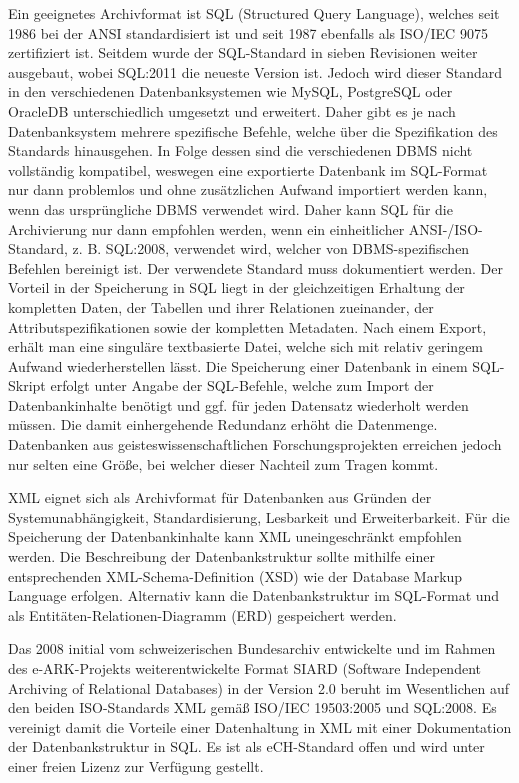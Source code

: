 Ein geeignetes Archivformat ist SQL (Structured Query Language), welches seit 1986 bei der ANSI standardisiert ist und seit 1987 ebenfalls als ISO/IEC 9075 zertifiziert ist. Seitdem wurde der SQL-Standard in sieben Revisionen weiter ausgebaut, wobei SQL:2011 die neueste Version ist. Jedoch wird dieser Standard in den verschiedenen Datenbanksystemen wie MySQL, PostgreSQL oder OracleDB unterschiedlich umgesetzt und erweitert. Daher gibt es je nach Datenbanksystem mehrere spezifische Befehle, welche über die Spezifikation des Standards hinausgehen. In Folge dessen sind die verschiedenen DBMS nicht vollständig kompatibel, weswegen eine exportierte Datenbank im SQL-Format nur dann problemlos und ohne zusätzlichen Aufwand importiert werden kann, wenn das ursprüngliche DBMS verwendet wird. Daher kann SQL für die Archivierung nur dann empfohlen werden, wenn ein einheitlicher ANSI-/ISO-Standard, z. B. SQL:2008, verwendet wird, welcher von DBMS-spezifischen Befehlen bereinigt ist. Der verwendete Standard muss dokumentiert werden. Der Vorteil in der Speicherung in SQL liegt in der gleichzeitigen Erhaltung der kompletten Daten, der Tabellen und ihrer Relationen zueinander, der Attributspezifikationen sowie der kompletten Metadaten. Nach einem Export, erhält man eine singuläre textbasierte Datei, welche sich mit relativ geringem Aufwand wiederherstellen lässt. Die Speicherung einer Datenbank in einem SQL-Skript erfolgt unter Angabe der SQL-Befehle, welche zum Import der Datenbankinhalte benötigt und ggf. für jeden Datensatz wiederholt werden müssen. Die damit einhergehende Redundanz erhöht die Datenmenge. Datenbanken aus geisteswissenschaftlichen Forschungsprojekten erreichen jedoch nur selten eine Größe, bei welcher dieser Nachteil zum Tragen kommt.

XML eignet sich als Archivformat für Datenbanken aus Gründen der Systemunabhängigkeit, Standardisierung, Lesbarkeit und Erweiterbarkeit. Für die Speicherung der Datenbankinhalte kann XML uneingeschränkt empfohlen werden. Die Beschreibung der Datenbankstruktur sollte mithilfe einer entsprechenden XML-Schema-Definition (XSD) wie der Database Markup Language erfolgen. Alternativ kann die Datenbankstruktur im SQL-Format und als Entitäten-Relationen-Diagramm (ERD) gespeichert werden.

Das 2008 initial vom schweizerischen Bundesarchiv entwickelte und im Rahmen des e-ARK-Projekts weiterentwickelte Format SIARD (Software Independent Archiving of Relational Databases) in der Version 2.0 beruht im Wesentlichen auf den beiden ISO-Standards XML gemäß ISO/IEC 19503:2005 und SQL:2008. Es vereinigt damit die Vorteile einer Datenhaltung in XML mit einer Dokumentation der Datenbankstruktur in SQL. Es ist als eCH-Standard offen und wird unter einer freien Lizenz zur Verfügung gestellt.

